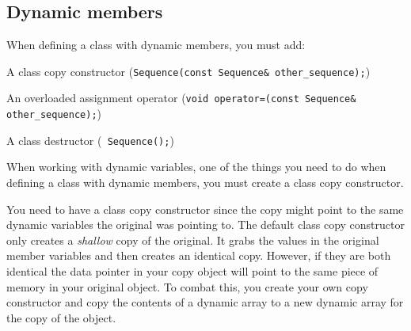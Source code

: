 \documentclass[11pt,a4paper,english]{paper}
\begin{document}
\subsection{Dynamic members}

\noindent When defining a class with dynamic members, you must add:
\bigskip
\begin{itemize} {
    \item A class copy constructor (\texttt{Sequence(const Sequence& other_sequence);})
    \item An overloaded assignment operator (\texttt{void operator=(const Sequence& other_sequence);}) 
    \item A class destructor (\texttt{~Sequence();})


    }
\end{itemize}

\bigskip
\noindent When working with dynamic variables, one of the things you need to do when defining a class with dynamic members, you must create a class copy constructor.

\bigskip

\begin{blackbox}{Example:} {

\begin{verbatim} {

// Example class
 class bag {
  
   // EXAMPLE

   int used;
   int* data_ptr = new int[30];
  
   // EXAMPLE

 }

  bag bag1 = ...;
  bag bag2(bag1);

\end{verbatim}
\end{blackbox}

\bigskip

\noindent You need to have a class copy constructor since the copy might point to the same dynamic variables the original was pointing to. The default class copy constructor only creates a \textit{shallow} copy of the original. It grabs the values in the original member variables and then creates an identical copy. However, if they are both identical the data pointer in your copy object will point to the same piece of memory in your original object. To combat this, you create your own copy constructor and copy the contents of a dynamic array to a new dynamic array for the copy of the object.
\end{document}
